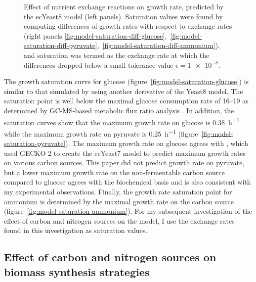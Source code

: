 \begin{figure}
  \caption{
    Effect of nutrient exchange reactions on growth rate, predicted by the ecYeast8 model (left panels).
    Saturation values were found by computing differences of growth rates with respect to exchange rates
    (right panels \ref{fig:model-saturation-diff-glucose},~\ref{fig:model-saturation-diff-pyruvate},~\ref{fig:model-saturation-diff-ammonium}),
    and saturation was termed as the exchange rate at which the differences dropped below a small tolerance value $\epsilon = \num{1e-8}$.
  }
  \label{fig:model-saturation}
\end{figure}

The growth saturation curve for glucose (figure~\ref{fig:model-saturation-glucose}) is similar to that simulated by \textcite{elsemmanWholecellModelingYeast2022} using another derivative of the Yeast8 model.
The saturation point is well below the maximal glucose consumption rate of \SIrange{16}{19}{\mmolgdwh} as determined by GC-MS-based metabolic flux ratio analysis \parencite{blankTCACycleActivity2004}.
In addition, the saturation curves show that the maximum growth rate on glucose is \SI{0.38}{\hour^{-1}} while the maximum growth rate on pyruvate is \SI{0.25}{\hour^{-1}} (figure~\ref{fig:model-saturation-pyruvate}).
The maximum growth rate on glucose agrees with \textcite{domenzainReconstructionCatalogueGenomescale2022}, which used GECKO 2 to create the ecYeast7 model to predict maximum growth rates on various carbon sources.
This paper did not predict growth rate on pyruvate, but a lower maximum growth rate on the non-fermentable carbon source compared to glucose agrees with the biochemical basis and is also consistent with my experimental observations.
Finally, the growth rate saturation point for ammonium is determined by the maximal growth rate on the carbon source (figure~\ref{fig:model-saturation-ammonium}).
For my subsequent investigation of the effect of carbon and nitrogen sources on the model, I use the exchange rates found in this investigation as saturation values.

\subsection{Effect of carbon and nitrogen sources on biomass synthesis strategies}
\label{subsec:model-grid}

